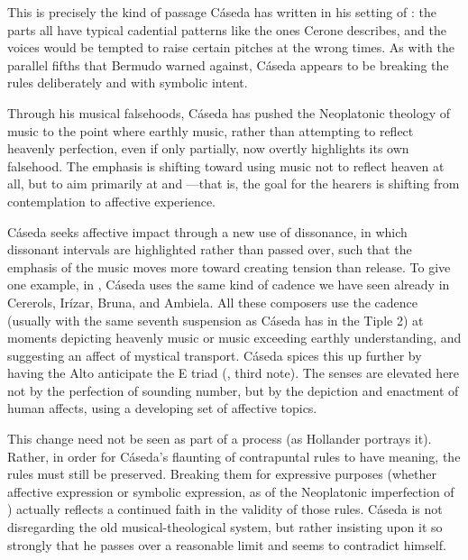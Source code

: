 This is precisely the kind of passage Cáseda has written in his setting of
: the parts all have typical cadential patterns like
the ones Cerone describes, and the voices would be tempted to raise certain
pitches at the wrong times. 
As with the parallel fifths that Bermudo warned against, Cáseda appears to be
breaking the rules deliberately and with symbolic intent.

Through his musical falsehoods, Cáseda has pushed the Neoplatonic theology of
music to the point where earthly music, rather than attempting to reflect
heavenly perfection, even if only partially, now overtly highlights its own
falsehood.
The emphasis is shifting toward using music not to reflect heaven at all, but
to aim primarily at  and ---that is, the goal for the hearers is shifting from contemplation to
affective experience.

Cáseda seeks affective impact through a new use of dissonance, in which
dissonant intervals are highlighted rather than passed over, such that the
emphasis of the music moves more toward creating tension than release.
To give one example, in , Cáseda uses the same kind of
 cadence we have seen already in Cererols, Irízar, Bruna, and
Ambiela.  
All these composers use the cadence (usually with the same seventh suspension
as Cáseda has in the Tiple 2) at moments depicting heavenly music or music
exceeding earthly understanding, and suggesting an affect of mystical
transport.
Cáseda spices this up further by having the Alto anticipate the E\fl{} triad
(, third note).
The senses are elevated here not by the perfection of sounding number, but by
the depiction and enactment of human affects, using a developing set of
affective topics.

This change need not be seen as part of a  process (as
Hollander portrays it).
Rather, in order for Cáseda's flaunting of contrapuntal rules to have meaning,
the rules must still be preserved.
Breaking them for expressive purposes (whether affective expression or symbolic
expression, as of the Neoplatonic imperfection of ) actually reflects a continued faith in the validity of those
rules.
Cáseda is not disregarding the old musical-theological system, but rather
insisting upon it so strongly that he passes over a reasonable limit and seems
to contradict himself.

